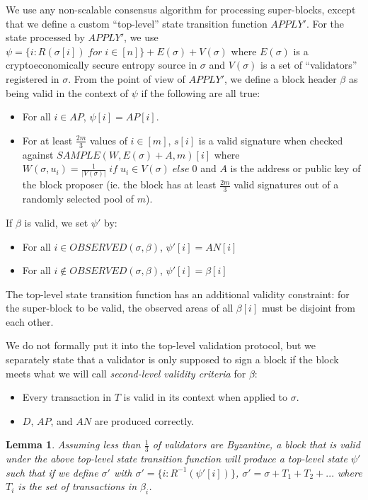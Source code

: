 \documentclass[11pt,a4paper]{report}
\theoremstyle{plain}
\newtheorem{lem}[thm]{Lemma}
\theoremstyle{definition}
\theoremstyle{remark}
\begin{document}
We use any non-scalable consensus algorithm for processing super-blocks, except that we define a custom ``top-level'' state transition function $APPLY'$. For the state processed by $APPLY'$, we use $\psi = \{i: R(\sigma[i]) \; for \; i \in [n]\} + E(\sigma) + V(\sigma)$ where $E(\sigma)$ is a cryptoeconomically secure entropy source in $\sigma$ and $V(\sigma)$ is a set of ``validators'' registered in $\sigma$. From the point of view of $APPLY'$, we define a block header $\beta$ as being valid in the context of $\psi$ if the following are all true:

\begin{itemize}
\item
For all $i \in AP$, $\psi[i] = AP[i]$.
\item
For at least $\frac{2m}{3}$ values of $i \in [m]$, $s[i]$ is a valid signature when checked against $SAMPLE(W, E(\sigma) + A, m)[i]$ where $W(\sigma, u_i) = \frac{1}{|V(\sigma)|} \; if \; u_i \in V(\sigma) \; else \; 0$ and $A$ is the address or public key of the block proposer (ie. the block has at least $\frac{2m}{3}$ valid signatures out of a randomly selected pool of $m$).
\end{itemize}

If $\beta$ is valid, we set $\psi'$ by:

\begin{itemize}
\item
For all $i \in OBSERVED(\sigma, \beta)$, $\psi'[i] = AN[i]$
\item
For all $i \notin OBSERVED(\sigma, \beta)$, $\psi'[i] = \beta[i]$
\end{itemize}

The top-level state transition function has an additional validity constraint: for the super-block to be valid, the observed areas of all $\beta[i]$ must be disjoint from each other.

We do not formally put it into the top-level validation protocol, but we separately state that a validator is only supposed to sign a block if the block meets what we will call \emph{second-level validity criteria} for $\beta$:

\begin{itemize}
\item
Every transaction in $T$ is valid in its context when applied to $\sigma$.
\item
$D$, $AP$, and $AN$ are produced correctly.
\end{itemize}

\begin{lem}
Assuming less than $\frac{1}{3}$ of validators are Byzantine, a block that is valid under the above top-level state transition function will produce a top-level state $\psi'$ such that if we define $\sigma'$ with $\sigma' = \{i: R^{-1}(\psi'[i])\}$, $\sigma' = \sigma + T_1 + T_2 + ...$ where $T_i$ is the set of transactions in $\beta_i$.
\end{lem}
\end{document}
